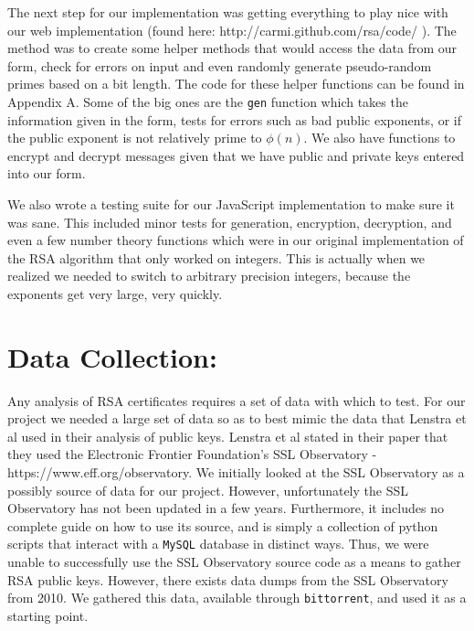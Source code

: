 \documentclass[12pt]{article}
\newcommand{\ty}[1]{\texttt{#1}}
\begin{document}
The next step for our implementation was getting everything to play nice with
our web implementation (found here: http://carmi.github.com/rsa/code/ ). The 
method was to create some helper methods that would access the data from our 
form, check for errors on input and
even randomly generate pseudo-random primes based on a bit length. The code for
these helper functions can be found in Appendix A. Some of the big ones are the
\ty{gen} function which takes the information given in the form, tests for
errors such as bad public exponents, or if the public exponent is not relatively
prime to $\phi(n)$. We also have functions to encrypt and decrypt messages given
that we have public and private keys entered into our form.

We also wrote a testing suite for our JavaScript implementation to make sure it
was sane. This included minor tests for generation, encryption, decryption, and
even a few number theory functions which were in our original implementation of
the RSA algorithm that only worked on integers. This is actually when we
realized we needed to switch to arbitrary precision integers, because the
exponents get very large, very quickly.




\section{Data Collection:}
Any analysis of RSA certificates requires a set of data with which to test. For
our project we needed a large set of data so as to best mimic the data that
Lenstra et al used in their analysis of public keys. Lenstra et al stated in their paper
that they used the Electronic Frontier Foundation's SSL Observatory -
https://www.eff.org/observatory. We initially looked at the SSL Observatory as a
possibly source of data for our project. However, unfortunately the SSL
Observatory has not been updated in a few years. Furthermore, it includes no
complete guide on how to use its source, and is simply a collection of python
scripts that interact with a \ty{MySQL} database in distinct ways. Thus, we were
unable to successfully use the SSL Observatory source code as a means to gather
RSA public keys. However, there exists data dumps from the SSL Observatory from
2010. We gathered this data, available through \ty{bittorrent}, and used it as a
starting point.
\end{document}
